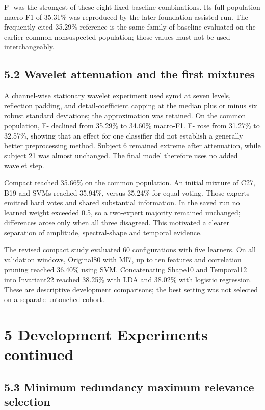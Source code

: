 \documentclass[10pt,a4paper]{article}
\begin{document}
F- was the strongest of these eight fixed baseline combinations. Its full-population macro-F1 of 35.31\% was reproduced by the later foundation-assisted run. The frequently cited 35.29\% reference is the same family of baseline evaluated on the earlier common nonsuspected population; those values must not be used interchangeably.


\subsection*{5.2 Wavelet attenuation and the first mixtures}

A channel-wise stationary wavelet experiment used sym4 at seven levels, reflection padding, and detail-coefficient capping at the median plus or minus six robust standard deviations; the approximation was retained. On the common population, F- declined from 35.29\% to 34.60\% macro-F1. F- rose from 31.27\% to 32.57\%, showing that an effect for one classifier did not establish a generally better preprocessing method. Subject  6 remained extreme after attenuation, while subject  21 was almost unchanged. The final model therefore uses no added wavelet step.


Compact  reached 35.66\% on the common population. An initial mixture of C27, B19 and  SVMs reached 35.94\%, versus 35.24\% for equal voting. Those experts emitted hard votes and shared substantial information. In the saved run no learned weight exceeded 0.5, so a two-expert majority remained unchanged; differences arose only when all three disagreed. This motivated a clearer separation of amplitude, spectral-shape and temporal evidence.


The revised compact study evaluated 60 configurations with five learners. On all validation windows, Original80 with MI7, up to ten features and correlation pruning reached 36.40\% using SVM. Concatenating Shape10 and Temporal12 into Invariant22 reached 38.25\% with LDA and 38.02\% with logistic regression. These are descriptive development comparisons; the best setting was not selected on a separate untouched cohort.


\section*{5 Development Experiments continued}

\subsection*{5.3 Minimum redundancy maximum relevance selection}
\end{document}
